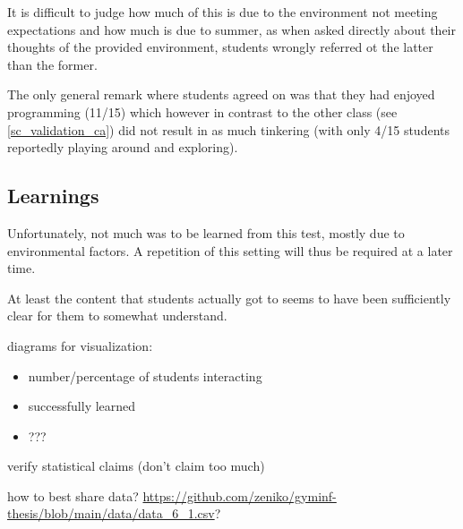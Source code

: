 It is difficult to judge how much of this is due to the environment not meeting expectations and how much is due to summer, as when asked directly about their thoughts of the provided environment, students wrongly referred ot the latter than the former.

The only general remark where students agreed on was that they had enjoyed programming (11/15) which however in contrast to the other class (see \ref{sc_validation_ca}) did not result in as much tinkering (with only 4/15 students reportedly playing around and exploring).


\subsection{Learnings}

Unfortunately, not much was to be learned from this test, mostly due to environmental factors. A repetition of this setting will thus be required at a later time.

At least the content that students actually got to seems to have been sufficiently clear for them to somewhat understand.

\begin{todo}
\item diagrams for visualization:
\begin{itemize}
\item number/percentage of students interacting
\item successfully learned
\item ???
\end{itemize}
\item verify statistical claims (don't claim too much)
\item how to best share data? \url{https://github.com/zeniko/gyminf-thesis/blob/main/data/data_6_1.csv}?
\end{todo}
